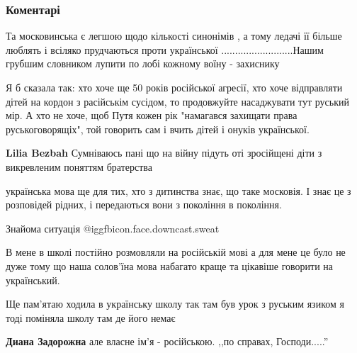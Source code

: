  
 
 
 
 
\subsubsection{Коментарі}

\begin{itemize} %

Та московинська є легшою щодо кількості синонімів , а тому ледачі її більше
люблять і всіляко прудчаються проти української ..........................Нашим
грубшим словником лупити по лобі кожному воїну - захиснику


Я б сказала так: хто хоче ще 50 років російської агресії, хто хоче відправляти
дітей на кордон з расійськім сусідом, то продовжуйте насаджувати тут руський
мір. А хто не хоче, щоб Путя кожен рік "намагався захищати права
руськоговорящіх", той говорить сам і вчить дітей і онуків української.

\begin{itemize} %
\textbf{Lilia Bezbah} Сумніваюсь пані що на війну підуть оті зросійщені діти з викревленим поняттям братерства
\end{itemize} %

українська мова ще для тих, хто з дитинства знає, що таке московія. І знає це з розповідей рідних, і передаються вони з покоління в покоління.

Знайома ситуація @igg{fbicon.face.downcast.sweat} 


В мене в школі постійно розмовляли на російській мові а для мене це було не
дуже тому що наша солов'їна мова набагато краще та цікавіше говорити на
український.

Ще пам'ятаю ходила в українську школу так там був урок з руським язиком я тоді
поміняла школу там де його немає

\begin{itemize} %
\textbf{Диана Задорожна} але власне ім'я - російською. ,,по справах, Господи.....''


\end{itemize}
\end{itemize}

